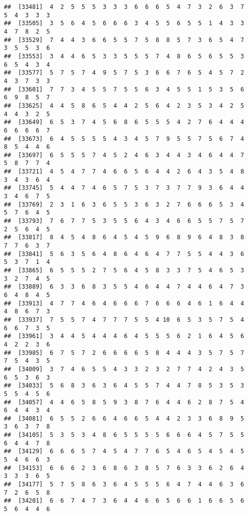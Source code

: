 \documentclass[
]{book}
\begin{document}
\begin{verbatim}
##  [33481]  4  2  5  5  5  3  3  3  6  6  6  5  4  7  3  2  6  3  7  5  4  3  3  3
##  [33505]  3  5  6  4  5  6  6  6  3  4  5  5  6  5  5  1  4  3  3  4  7  8  2  5
##  [33529]  7  4  4  3  6  6  5  5  7  5  8  8  5  7  3  6  5  4  7  3  5  5  3  6
##  [33553]  3  4  4  6  5  3  3  5  5  5  7  4  8  6  5  6  5  5  3  6  5  4  3  4
##  [33577]  5  7  5  7  4  9  5  7  5  3  6  6  7  6  5  4  5  7  2  4  3  7  3  3
##  [33601]  7  7  3  4  5  5  7  5  5  6  3  4  5  5  1  5  3  5  6  6  9  8  5  7
##  [33625]  4  4  5  8  6  5  4  4  2  5  6  4  2  3  5  3  4  2  5  4  4  3  2  5
##  [33649]  6  5  3  7  4  5  6  8  6  5  5  5  4  2  7  6  4  4  4  6  6  6  6  7
##  [33673]  6  4  5  5  5  5  4  3  4  5  7  9  5  5  7  5  6  7  4  8  5  4  4  6
##  [33697]  6  5  5  5  7  4  5  2  4  6  3  4  4  3  4  6  4  4  7  5  8  7  7  4
##  [33721]  4  5  4  7  7  4  6  6  5  6  4  4  2  6  4  3  5  4  8  3  4  3  6  4
##  [33745]  5  4  4  7  4  6  5  7  5  3  7  3  7  7  9  3  6  4  4  3  4  6  7  5
##  [33769]  2  3  1  6  3  6  5  5  3  6  3  2  7  6  6  6  5  3  4  5  7  6  4  5
##  [33793]  7  6  7  7  5  3  5  5  6  4  3  4  6  6  5  5  7  5  7  2  5  6  4  5
##  [33817]  8  4  5  4  8  6  4  5  4  5  9  6  8  9  6  4  8  3  8  7  7  6  3  7
##  [33841]  5  6  3  5  6  4  8  6  4  6  4  7  7  5  5  4  4  3  6  5  3  7  1  4
##  [33865]  6  5  5  5  2  7  5  6  4  5  8  3  3  7  5  4  6  5  3  3  2  7  4  5
##  [33889]  6  3  3  6  8  3  5  5  4  6  4  4  7  4  4  6  4  7  3  6  4  8  4  5
##  [33913]  4  7  7  4  6  4  6  6  6  7  6  6  6  4  6  1  6  4  4  4  8  6  7  3
##  [33937]  7  5  5  7  4  7  7  7  5  5  4 10  6  5  3  5  7  5  4  6  6  7  3  5
##  [33961]  3  4  4  5  4  4  4  6  4  5  5  5  6  2  1  6  4  5  6  4  2  2  3  6
##  [33985]  6  7  5  7  2  6  6  6  6  5  8  4  4  4  3  5  7  5  7  7  5  4  3  5
##  [34009]  3  7  4  6  5  5  4  3  3  2  3  2  7  7  4  2  4  3  5  6  5  3  6  3
##  [34033]  5  6  8  3  6  3  6  4  5  5  7  4  4  7  8  5  3  5  3  5  5  4  5  6
##  [34057]  4  4  6  5  8  5  9  3  8  7  6  4  4  6  2  8  7  5  4  6  4  4  3  4
##  [34081]  6  5  5  2  6  6  4  6  6  5  4  4  2  3  3  6  8  9  5  3  6  3  7  8
##  [34105]  5  3  5  3  4  8  6  5  5  5  5  6  6  6  4  5  7  5  5  6  4  4  7  8
##  [34129]  6  6  6  5  7  4  5  4  7  7  6  5  4  6  5  4  5  4  5  5  4  6  6  3
##  [34153]  6  6  6  2  3  6  8  6  3  8  5  7  6  3  3  6  2  6  4  3  3  3  6  5
##  [34177]  5  7  5  8  6  3  6  4  5  5  5  6  4  7  4  4  6  3  6  7  2  6  5  8
##  [34201]  6  6  7  4  7  3  6  4  4  6  6  5  6  6  1  6  6  5  6  5  6  4  4  6

\end{verbatim}
\end{document}
